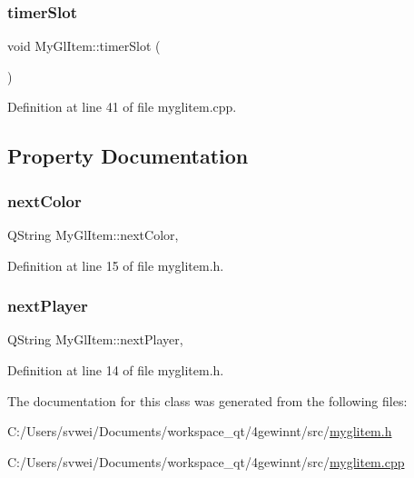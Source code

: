\subsubsection{\texorpdfstring{timerSlot}{timerSlot}}
{\footnotesize\ttfamily void My\+Gl\+Item\+::timer\+Slot (\begin{DoxyParamCaption}{ }\end{DoxyParamCaption})\hspace{0.3cm}{\ttfamily [slot]}}



Definition at line 41 of file myglitem.\+cpp.



\subsection{Property Documentation}
\mbox{\label{class_my_gl_item_a0231b71bc8a4bd91b69b498c8f4a9483}} 
\subsubsection{\texorpdfstring{nextColor}{nextColor}}
{\footnotesize\ttfamily Q\+String My\+Gl\+Item\+::next\+Color\hspace{0.3cm}{\ttfamily [read]}, {\ttfamily [write]}}



Definition at line 15 of file myglitem.\+h.

\mbox{\label{class_my_gl_item_abc171f46578b349ef427434969ae2220}} 
\subsubsection{\texorpdfstring{nextPlayer}{nextPlayer}}
{\footnotesize\ttfamily Q\+String My\+Gl\+Item\+::next\+Player\hspace{0.3cm}{\ttfamily [read]}, {\ttfamily [write]}}



Definition at line 14 of file myglitem.\+h.



The documentation for this class was generated from the following files\+:\begin{DoxyCompactItemize}
\item 
C\+:/\+Users/svwei/\+Documents/workspace\+\_\+qt/4gewinnt/src/\mbox{\hyperlink{myglitem_8h}{myglitem.\+h}}\item 
C\+:/\+Users/svwei/\+Documents/workspace\+\_\+qt/4gewinnt/src/\mbox{\hyperlink{myglitem_8cpp}{myglitem.\+cpp}}\end{DoxyCompactItemize}
